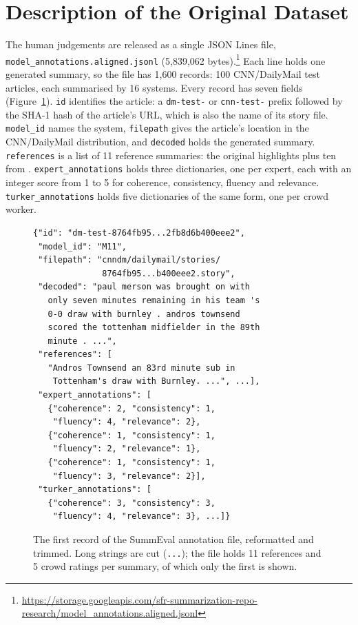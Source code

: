 \documentclass[11pt]{article}
\begin{document}
\section{Description of the Original Dataset}
\label{sec:data}

The human judgements are released as a single JSON Lines file, \texttt{model\_\allowbreak annotations.\allowbreak aligned.\allowbreak jsonl} (5,839,062 bytes).\footnote{\url{https://storage.googleapis.com/sfr-summarization-repo-research/model_annotations.aligned.jsonl}} Each line holds one generated summary, so the file has 1,600 records: 100 CNN/DailyMail test articles, each summarised by 16 systems. Every record has seven fields (Figure~\ref{fig:summeval}). \texttt{id} identifies the article: a \texttt{dm-test-} or \texttt{cnn-test-} prefix followed by the SHA-1 hash of the article's URL, which is also the name of its story file. \texttt{model\_id} names the system, \texttt{filepath} gives the article's location in the CNN/DailyMail distribution, and \texttt{decoded} holds the generated summary. \texttt{references} is a list of 11 reference summaries: the original highlights plus ten from \citet{kryscinski-etal-2020-evaluating}. \texttt{expert\_annotations} holds three dictionaries, one per expert, each with an integer score from 1 to 5 for coherence, consistency, fluency and relevance. \texttt{turker\_annotations} holds five dictionaries of the same form, one per crowd worker.

\begin{figure}[t]
\footnotesize
\begin{verbatim}
{"id": "dm-test-8764fb95...2fb8d6b400eee2",
 "model_id": "M11",
 "filepath": "cnndm/dailymail/stories/
              8764fb95...b400eee2.story",
 "decoded": "paul merson was brought on with
   only seven minutes remaining in his team 's
   0-0 draw with burnley . andros townsend
   scored the tottenham midfielder in the 89th
   minute . ...",
 "references": [
   "Andros Townsend an 83rd minute sub in
    Tottenham's draw with Burnley. ...", ...],
 "expert_annotations": [
   {"coherence": 2, "consistency": 1,
    "fluency": 4, "relevance": 2},
   {"coherence": 1, "consistency": 1,
    "fluency": 2, "relevance": 1},
   {"coherence": 1, "consistency": 1,
    "fluency": 3, "relevance": 2}],
 "turker_annotations": [
   {"coherence": 3, "consistency": 3,
    "fluency": 4, "relevance": 3}, ...]}
\end{verbatim}
\caption{The first record of the SummEval annotation file, reformatted and trimmed. Long strings are cut (\texttt{...}); the file holds 11 references and 5 crowd ratings per summary, of which only the first is shown.}
\label{fig:summeval}
\end{figure}
\end{document}
